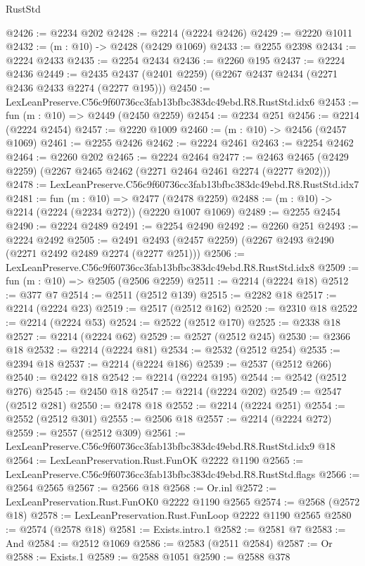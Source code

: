 \begin{lexlean}{RustStd}
\begin{coremodule}
@2426 := @2234 @202
@2428 := @2214 (@2224 @2426)
@2429 := @2220 @1011
@2432 := (m : @10) -> @2428 (@2429 @1069)
@2433 := @2255 @2398
@2434 := @2224 @2433
@2435 := @2254 @2434
@2436 := @2260 @195
@2437 := @2224 @2436
@2449 := @2435 @2437 (@2401 @2259) (@2267 @2437 @2434 (@2271 @2436 @2433 @2274 (@2277 @195)))
@2450 := LexLeanPreserve.C56c9f60736cc3fab13bfbc383dc49ebd.R8.RustStd.idx6
@2453 := fun (m : @10) => @2449 (@2450 @2259)
@2454 := @2234 @251
@2456 := @2214 (@2224 @2454)
@2457 := @2220 @1009
@2460 := (m : @10) -> @2456 (@2457 @1069)
@2461 := @2255 @2426
@2462 := @2224 @2461
@2463 := @2254 @2462
@2464 := @2260 @202
@2465 := @2224 @2464
@2477 := @2463 @2465 (@2429 @2259) (@2267 @2465 @2462 (@2271 @2464 @2461 @2274 (@2277 @202)))
@2478 := LexLeanPreserve.C56c9f60736cc3fab13bfbc383dc49ebd.R8.RustStd.idx7
@2481 := fun (m : @10) => @2477 (@2478 @2259)
@2488 := (m : @10) -> @2214 (@2224 (@2234 @272)) (@2220 @1007 @1069)
@2489 := @2255 @2454
@2490 := @2224 @2489
@2491 := @2254 @2490
@2492 := @2260 @251
@2493 := @2224 @2492
@2505 := @2491 @2493 (@2457 @2259) (@2267 @2493 @2490 (@2271 @2492 @2489 @2274 (@2277 @251)))
@2506 := LexLeanPreserve.C56c9f60736cc3fab13bfbc383dc49ebd.R8.RustStd.idx8
@2509 := fun (m : @10) => @2505 (@2506 @2259)
@2511 := @2214 (@2224 @18)
@2512 := @377 @7
@2514 := @2511 (@2512 @139)
@2515 := @2282 @18
@2517 := @2214 (@2224 @23)
@2519 := @2517 (@2512 @162)
@2520 := @2310 @18
@2522 := @2214 (@2224 @53)
@2524 := @2522 (@2512 @170)
@2525 := @2338 @18
@2527 := @2214 (@2224 @62)
@2529 := @2527 (@2512 @245)
@2530 := @2366 @18
@2532 := @2214 (@2224 @81)
@2534 := @2532 (@2512 @254)
@2535 := @2394 @18
@2537 := @2214 (@2224 @186)
@2539 := @2537 (@2512 @266)
@2540 := @2422 @18
@2542 := @2214 (@2224 @195)
@2544 := @2542 (@2512 @276)
@2545 := @2450 @18
@2547 := @2214 (@2224 @202)
@2549 := @2547 (@2512 @281)
@2550 := @2478 @18
@2552 := @2214 (@2224 @251)
@2554 := @2552 (@2512 @301)
@2555 := @2506 @18
@2557 := @2214 (@2224 @272)
@2559 := @2557 (@2512 @309)
@2561 := LexLeanPreserve.C56c9f60736cc3fab13bfbc383dc49ebd.R8.RustStd.idx9 @18
@2564 := LexLeanPreservation.Rust.FunOK @2222 @1190
@2565 := LexLeanPreserve.C56c9f60736cc3fab13bfbc383dc49ebd.R8.RustStd.flags
@2566 := @2564 @2565
@2567 := @2566 @18
@2568 := Or.inl
@2572 := LexLeanPreservation.Rust.FunOK0 @2222 @1190 @2565
@2574 := @2568 (@2572 @18)
@2578 := LexLeanPreservation.Rust.FunLoop @2222 @1190 @2565
@2580 := @2574 (@2578 @18)
@2581 := Exists.intro.{1}
@2582 := @2581 @7
@2583 := And
@2584 := @2512 @1069
@2586 := @2583 (@2511 @2584)
@2587 := Or
@2588 := Exists.{1}
@2589 := @2588 @1051
@2590 := @2588 @378

\end{coremodule}
\end{lexlean}

